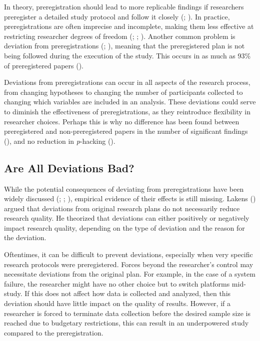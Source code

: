 \documentclass[
  man,
  floatsintext,
  longtable,
  nolmodern,
  notxfonts,
  notimes,
  colorlinks=true,linkcolor=blue,citecolor=blue,urlcolor=blue]{apa7}
\begin{document}
In theory, preregistration should lead to more replicable findings if
researchers preregister a detailed study protocol and follow it closely
(;
). In practice,
preregistrations are often imprecise and incomplete, making them less
effective at restricting researcher degrees of freedom
(;
;
). Another common
problem is deviation from preregistrations
(;
),
meaning that the preregistered plan is not being followed during the
execution of the study. This occurs in as much as 93\% of preregistered
papers ().

Deviations from preregistrations can occur in all aspects of the
research process, from changing hypotheses to changing the number of
participants collected to changing which variables are included in an
analysis. These deviations could serve to diminish the effectiveness of
preregistrations, as they reintroduce flexibility in researcher choices.
Perhaps this is why no difference has been found between preregistered
and non-preregistered papers in the number of significant findings
(), and no reduction in \emph{p}-hacking
().

\subsection{Are All Deviations Bad?}\label{are-all-deviations-bad}

While the potential consequences of deviating from preregistrations have
been widely discussed (;
;
), empirical
evidence of their effects is still missing. Lakens
() argued that deviations from original
research plans do not necessarily reduce research quality. He theorized
that deviations can either positively or negatively impact research
quality, depending on the type of deviation and the reason for the
deviation.

Oftentimes, it can be difficult to prevent deviations, especially when
very specific research protocols were preregistered. Forces beyond the
researcher's control may necessitate deviations from the original plan.
For example, in the case of a system failure, the researcher might have
no other choice but to switch platforms mid-study. If this does not
affect how data is collected and analyzed, then this deviation should
have little impact on the quality of results. However, if a researcher
is forced to terminate data collection before the desired sample size is
reached due to budgetary restrictions, this can result in an
underpowered study compared to the preregistration.
\end{document}
